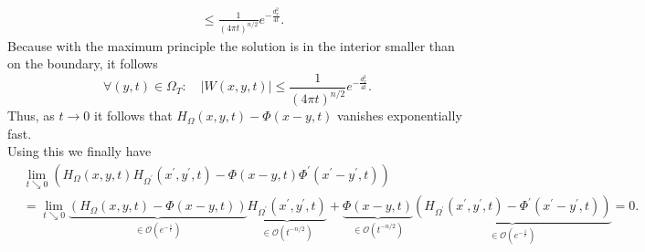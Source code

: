 \documentclass[A4,12pt,twoside]{book}
\begin{document}
{\begin{align*}
        &\leq \frac{1}{(4 \pi t)^{n/2}} e^{- \frac{d_x^2}{4t}}.
    \end{align*}
    Because with the maximum principle the solution is in the interior smaller than on the boundary, it follows 
    \[
    \forall (y,t) \in \Omega_T: \quad |W(x,y,t)| \leq \frac{1}{(4 \pi t)^{n/2}} e^{- \frac{d_x^2}{4t}}.
    \]
    Thus, as $t \to 0$ it follows that $H_\Omega (x,y,t) - \Phi (x-y,t)$ vanishes exponentially fast. \\
    Using this we finally have  
        \begin{align*}
           & \lim_{t \searrow 0} (H_{\Omega} (x,y,t) H_{\Omega^\prime} (x^\prime,y^\prime,t) - \Phi (x-y,t) \Phi^\prime (x^\prime-y^\prime,t) ) \\
           &= \lim_{t \searrow 0} \underbrace{ \left( H_{\Omega} (x,y,t)- \Phi (x-y,t) \right)}_{\in \mathcal{O}(e^{-\frac{1}{t}})} \underbrace{ H_{\Omega^\prime} (x^\prime,y^\prime,t)}_{\in \mathcal{O}(t^{-n/2})} + \underbrace{\Phi (x-y,t)}_{\in \mathcal{O}(t^{-n/2})} \underbrace{( H_{\Omega^\prime} (x^\prime,y^\prime,t) -  \Phi^\prime (x^\prime-y^\prime,t))}_{\in \mathcal{O}(e^{-\frac{1}{t}})}  =0.
        \end{align*}
}
\end{document}
